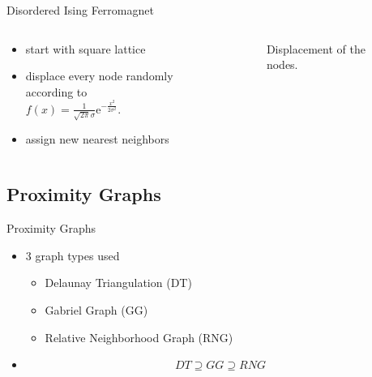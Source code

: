 \documentclass{beamer}
\begin{document}
        \begin{frame}{Disordered Ising Ferromagnet}
            \begin{columns}[t]
                \begin{column}{5cm}
                    \begin{itemize}
                        \item<1-> start with square lattice
                        \item<2-> displace every node randomly according to\\
                            \(f(x)=\frac{1}{\sqrt{2\pi}\sigma}\mathrm{e}^{-\frac{x^2}{2\sigma^2}}.\){}
                        \item<3-> assign new nearest neighbors
                    \end{itemize}
                \end{column}
                \pause
                \begin{column}{6cm}
                    \vspace{-1cm}
                    \begin{figure}[htbp]
                        \centering
                        
                        \caption
                        {
                            Displacement of the nodes.
                        }
                    \end{figure}
                \end{column}
            \end{columns}
        \end{frame}

    \subsection{Proximity Graphs}
        \begin{frame}{Proximity Graphs}
            \begin{itemize}[<+->]
                \item{ 3 graph types used
                    \begin{itemize}
                        \item Delaunay Triangulation (DT) \cite{Katajainen}
                        \item Gabriel Graph (GG) \cite{Gabriel1969}
                        \item Relative Neighborhood Graph (RNG) \cite{Toussaint1980}
                    \end{itemize}
                }
                \item{
                    \begin{equation}
                        DT \supseteq GG \supseteq RNG
                    \end{equation}
                }
            \end{itemize}
        \end{frame}
\end{document}
